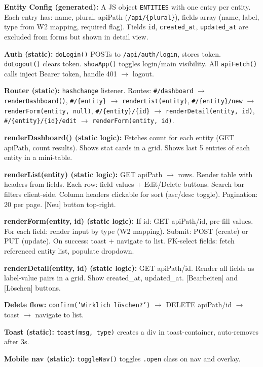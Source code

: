 \documentclass[11pt,a4paper]{article}
\begin{document}
\textbf{Entity Config (generated):} A JS object \texttt{ENTITIES} with one entry per entity. Each entry has: name, plural, apiPath (\texttt{/api/\{plural\}}), fields array (name, label, type from W2 mapping, required flag). Fields \texttt{id}, \texttt{created\_at}, \texttt{updated\_at} are excluded from forms but shown in detail view.

\textbf{Auth (static):} \texttt{doLogin()} POSTs to \texttt{/api/auth/login}, stores token. \texttt{doLogout()} clears token. \texttt{showApp()} toggles login/main visibility. All \texttt{apiFetch()} calls inject Bearer token, handle 401 $\to$ logout.

\textbf{Router (static):} \texttt{hashchange} listener. Routes: \texttt{\#/dashboard} $\to$ \texttt{renderDashboard()}, \texttt{\#/\{entity\}} $\to$ \texttt{renderList(entity)}, \texttt{\#/\{entity\}/new} $\to$ \texttt{renderForm(entity, null)}, \texttt{\#/\{entity\}/\{id\}} $\to$ \texttt{renderDetail(entity, id)}, \texttt{\#/\{entity\}/\{id\}/edit} $\to$ \texttt{renderForm(entity, id)}.

\textbf{renderDashboard() (static logic):} Fetches count for each entity (GET apiPath, count results). Shows stat cards in a grid. Shows last 5 entries of each entity in a mini-table.

\textbf{renderList(entity) (static logic):} GET apiPath $\to$ rows. Render table with headers from fields. Each row: field values + Edit/Delete buttons. Search bar filters client-side. Column headers clickable for sort (asc/desc toggle). Pagination: 20 per page. [Neu] button top-right.

\textbf{renderForm(entity, id) (static logic):} If id: GET apiPath/id, pre-fill values. For each field: render input by type (W2 mapping). Submit: POST (create) or PUT (update). On success: toast + navigate to list. FK-select fields: fetch referenced entity list, populate dropdown.

\textbf{renderDetail(entity, id) (static logic):} GET apiPath/id. Render all fields as label-value pairs in a grid. Show created\_at, updated\_at. [Bearbeiten] and [L\"oschen] buttons.

\textbf{Delete flow:} \texttt{confirm('Wirklich l\"oschen?')} $\to$ DELETE apiPath/id $\to$ toast $\to$ navigate to list.

\textbf{Toast (static):} \texttt{toast(msg, type)} creates a div in toast-container, auto-removes after 3s.

\textbf{Mobile nav (static):} \texttt{toggleNav()} toggles \texttt{.open} class on nav and overlay.
\end{document}
